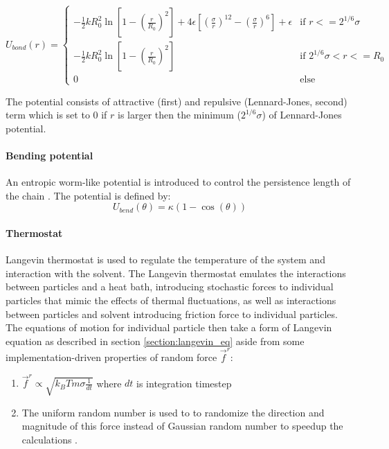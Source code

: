 \documentclass[
    paper=A4,pagesize=automedia,fontsize=12pt,
    BCOR=15mm,DIV=22,
    twoside,headinclude,footinclude=false,
    fleqn,             %
    bibliography=totocnumbered,          %
    listof=totoc,                %
    listof=flat,                 %
    cleardoublepage=empty      %
    numbers=endperiod
]{scrartcl}
\begin{document}
\begin{equation}
    U_{bond}(r) = 
    \begin{cases}
        -\frac{1}{2} k R_0^2 \ln\left[1 - \left(\frac{r}{R_0}\right)^2\right] + 4 \epsilon \left[\left(\frac{\sigma}{r}\right)^{12} - \left(\frac{\sigma}{r}\right)^6\right] + \epsilon & \text{if } r <= 2^{1/6} \sigma \\
        -\frac{1}{2} k R_0^2 \ln\left[1 - \left(\frac{r}{R_0}\right)^2\right] & \text{if } 2^{1/6}\sigma < r <= R_0\\
        0 & \text{else}
    \end{cases}
\end{equation}

The potential consists of attractive (first) and repulsive (Lennard-Jones, second) term which is set to $0$ if $r$ is larger then
the minimum ($2^{1/6}\sigma$) of Lennard-Jones potential.

\paragraph{Bending potential}
\label{par:bend_potential}
An entropic worm-like potential is introduced to control the persistence length of the chain \cite{svaneborg_2020}.
The potential is defined by:
\begin{equation}
    U_{bend}(\theta) = \kappa (1 - \cos(\theta))
\end{equation}

\paragraph{Thermostat}
Langevin thermostat is used to regulate the temperature of the system and interaction with the solvent.
The Langevin thermostat emulates the interactions between particles and a heat bath, 
introducing stochastic forces to individual particles that mimic the effects of thermal fluctuations,
as well as interactions between particles and solvent introducing friction force to individual particles.
The equations of motion for individual particle then take a form of Langevin equation as described
in section \ref{section:langevin_eq} aside from some implementation-driven properties of random force $\vec{f}^r$:
\begin{enumerate}
    \item $\vec{f}^r \propto \sqrt{k_B T m \sigma \frac{1}{dt}}$ where $dt$ is integration timestep \cite{LAMMPS}
    \item The uniform random number is used to to randomize the direction 
    and magnitude of this force instead of Gaussian random number to speedup the
    calculations \cite{LAMMPS} \cite{dunweg}.
\end{enumerate}
\end{document}
